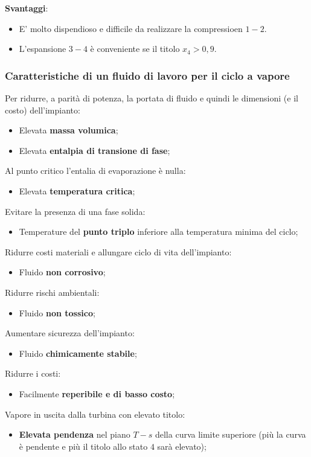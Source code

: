 \textbf{Svantaggi}:
\begin{itemize}
    \item E' molto dispendioso e difficile da realizzare la compressioen $1-2$.
    \item L'espansione $3-4$ è conveniente se il titolo $x_4 > 0,9$.
\end{itemize}
\subsubsection{Caratteristiche di un fluido di lavoro per il ciclo a vapore}
Per ridurre, a parità di potenza, la portata di fluido e quindi le dimensioni (e il costo) dell'impianto:
\begin{itemize}
    \item Elevata \textbf{massa volumica};
    \item Elevata \textbf{entalpia di transione di fase};
\end{itemize}
Al punto critico l'entalia di evaporazione è nulla:
\begin{itemize}
    \item Elevata \textbf{temperatura critica};
\end{itemize}
Evitare la presenza di una fase solida:
\begin{itemize}
    \item Temperature del \textbf{punto triplo} inferiore alla temperatura minima del ciclo;
\end{itemize}
Ridurre costi materiali e allungare ciclo di vita dell'impianto:
\begin{itemize}
    \item Fluido \textbf{non corrosivo};
\end{itemize}
Ridurre rischi ambientali:
\begin{itemize}
    \item Fluido \textbf{non tossico};
\end{itemize}
Aumentare sicurezza dell'impianto:
\begin{itemize}
    \item Fluido \textbf{chimicamente stabile};
\end{itemize}
Ridurre i costi:
\begin{itemize}
    \item Facilmente \textbf{reperibile e di basso costo};
\end{itemize}
Vapore in uscita dalla turbina con elevato titolo:
\begin{itemize}
    \item \textbf{Elevata pendenza} nel piano $T-s$ della curva limite superiore (più la curva è pendente e più il titolo allo stato $4$ sarà elevato);
\end{itemize}
